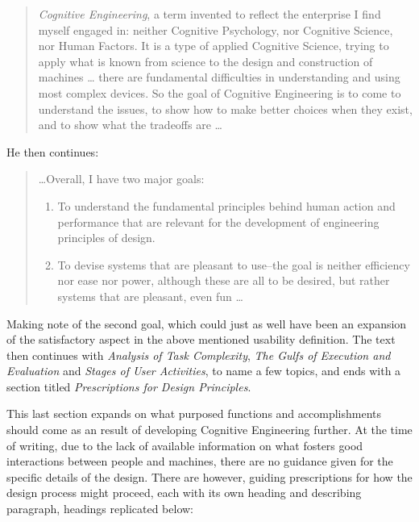 \begin{quote}
  \textit{Cognitive Engineering}, a term invented to reflect the enterprise I find
  myself engaged in: neither Cognitive Psychology, nor Cognitive Science, nor
  Human Factors. It is a type of applied Cognitive Science, trying to apply
  what is known from science to the design and construction of machines \ldots
  there are fundamental difficulties in
  understanding and using most complex devices. So the goal of Cognitive
  Engineering is to come to understand the issues, to show how to make better
  choices when they exist, and to show what the tradeoffs are \ldots
\end{quote}

He then continues\cite[p. 32]{citeUserCenteredNorman}:
\begin{quote}
  \ldots Overall, I have two major goals:
  \begin{enumerate}
    \item{To understand the fundamental principles behind human action and performance that are relevant for the
    development of engineering principles of design.}
    \item{To devise systems that
    are pleasant to use--the goal is neither efficiency nor ease nor power, although
    these are all to be desired, but rather systems that are pleasant, even fun
    \ldots}
  \end{enumerate}
\end{quote}

Making note of the second goal, which could just as well have been an expansion
of the satisfactory aspect in the above mentioned usability definition. The
text then continues with
\textit{Analysis of Task Complexity},
\textit{The Gulfs of Execution and Evaluation} and
\textit{Stages of User Activities}, to name a few topics, and ends with
a section titled \textit{Prescriptions for Design Principles}.

This last section expands on what purposed functions and
accomplishments should come as an result of developing Cognitive Engineering
further.
At the time of writing, due to the lack of available information on what
fosters good interactions between people and machines, there
are no guidance given for the specific details of the design. There are however,
guiding prescriptions for how the design process might proceed\cite[p.
59-61]{citeUserCenteredNorman}, each with its own heading and describing
paragraph, headings replicated below:

